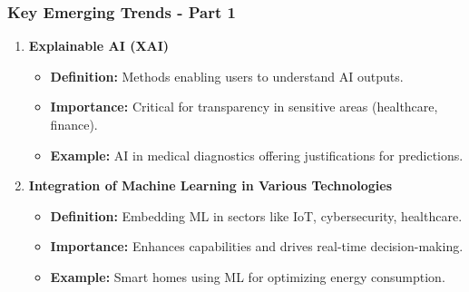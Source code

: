 \documentclass[aspectratio=169]{beamer}
\begin{document}
\begin{frame}[fragile]
    \frametitle{Key Emerging Trends - Part 1}
    \begin{enumerate}
        \item \textbf{Explainable AI (XAI)}
            \begin{itemize}
                \item \textbf{Definition:} Methods enabling users to understand AI outputs.
                \item \textbf{Importance:} Critical for transparency in sensitive areas (healthcare, finance).
                \item \textbf{Example:} AI in medical diagnostics offering justifications for predictions.
            \end{itemize}

        \item \textbf{Integration of Machine Learning in Various Technologies}
            \begin{itemize}
                \item \textbf{Definition:} Embedding ML in sectors like IoT, cybersecurity, healthcare.
                \item \textbf{Importance:} Enhances capabilities and drives real-time decision-making.
                \item \textbf{Example:} Smart homes using ML for optimizing energy consumption.
            \end{itemize}
    \end{enumerate}
\end{frame}
\end{document}
